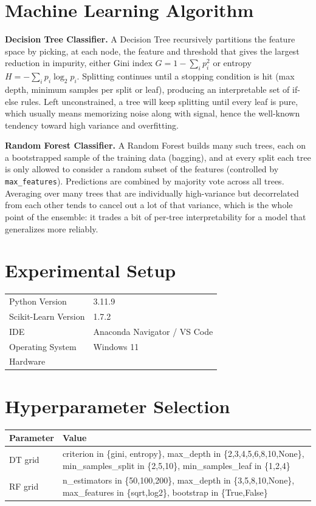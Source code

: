 \documentclass[12pt,a4paper]{article}
\begin{document}
\section{Machine Learning Algorithm}

\textbf{Decision Tree Classifier.} A Decision Tree recursively partitions the feature space by
picking, at each node, the feature and threshold that gives the largest reduction in impurity, either
Gini index $G = 1 - \sum_i p_i^2$ or entropy $H = -\sum_i p_i \log_2 p_i$. Splitting continues until a
stopping condition is hit (max depth, minimum samples per split or leaf), producing an interpretable
set of if-else rules. Left unconstrained, a tree will keep splitting until every leaf is pure, which
usually means memorizing noise along with signal, hence the well-known tendency toward high variance
and overfitting.

\textbf{Random Forest Classifier.} A Random Forest builds many such trees, each on a bootstrapped
sample of the training data (bagging), and at every split each tree is only allowed to consider a
random subset of the features (controlled by \texttt{max\_features}). Predictions are combined by
majority vote across all trees. Averaging over many trees that are individually high-variance but
decorrelated from each other tends to cancel out a lot of that variance, which is the whole point of
the ensemble: it trades a bit of per-tree interpretability for a model that generalizes more
reliably.

\section{Experimental Setup}
\begin{tabular}{ll}
\toprule
Python Version & 3.11.9 \\
Scikit-Learn Version & 1.7.2 \\
IDE & Anaconda Navigator / VS Code \\
Operating System & Windows 11 \\
Hardware & \\
\bottomrule
\end{tabular}

\section{Hyperparameter Selection}
\begin{tabular}{p{2.3cm}p{12.5cm}}
\toprule
Parameter & Value\\
\midrule
DT grid & criterion in \{gini, entropy\}, max\_depth in \{2,3,4,5,6,8,10,None\}, min\_samples\_split
in \{2,5,10\}, min\_samples\_leaf in \{1,2,4\} \\
RF grid & n\_estimators in \{50,100,200\}, max\_depth in \{3,5,8,10,None\}, max\_features in
\{sqrt,log2\}, bootstrap in \{True,False\} \\
\bottomrule
\end{tabular}
\end{document}
